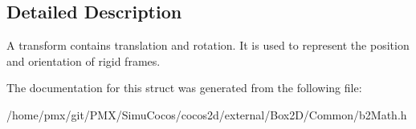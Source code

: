 \subsection{Detailed Description}
A transform contains translation and rotation. It is used to represent the position and orientation of rigid frames. 

The documentation for this struct was generated from the following file\+:\begin{DoxyCompactItemize}
\item 
/home/pmx/git/\+P\+M\+X/\+Simu\+Cocos/cocos2d/external/\+Box2\+D/\+Common/b2\+Math.\+h\end{DoxyCompactItemize}
